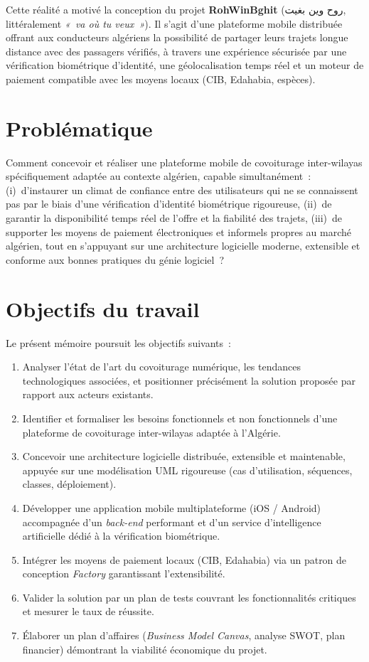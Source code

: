 \documentclass[12pt, a4paper, oneside]{report}
\begin{document}
Cette réalité a motivé la conception du projet \textbf{RohWinBghit} (\textarabic{روح وين بغيت}, littéralement \textit{«~va où tu veux~»}). Il s'agit d'une plateforme mobile distribuée offrant aux conducteurs algériens la possibilité de partager leurs trajets longue distance avec des passagers vérifiés, à travers une expérience sécurisée par une vérification biométrique d'identité, une géolocalisation temps réel et un moteur de paiement compatible avec les moyens locaux (CIB, Edahabia, espèces).

\section*{Problématique}

Comment concevoir et réaliser une plateforme mobile de covoiturage inter-wilayas spécifiquement adaptée au contexte algérien, capable simultanément~: (i)~d'instaurer un climat de confiance entre des utilisateurs qui ne se connaissent pas par le biais d'une vérification d'identité biométrique rigoureuse, (ii)~de garantir la disponibilité temps réel de l'offre et la fiabilité des trajets, (iii)~de supporter les moyens de paiement électroniques et informels propres au marché algérien, tout en s'appuyant sur une architecture logicielle moderne, extensible et conforme aux bonnes pratiques du génie logiciel~?

\section*{Objectifs du travail}

Le présent mémoire poursuit les objectifs suivants~:
\begin{enumerate}[leftmargin=1.8em]
  \item Analyser l'état de l'art du covoiturage numérique, les tendances technologiques associées, et positionner précisément la solution proposée par rapport aux acteurs existants.
  \item Identifier et formaliser les besoins fonctionnels et non fonctionnels d'une plateforme de covoiturage inter-wilayas adaptée à l'Algérie.
  \item Concevoir une architecture logicielle distribuée, extensible et maintenable, appuyée sur une modélisation UML rigoureuse (cas d'utilisation, séquences, classes, déploiement).
  \item Développer une application mobile multiplateforme (iOS / Android) accompagnée d'un \textit{back-end} performant et d'un service d'intelligence artificielle dédié à la vérification biométrique.
  \item Intégrer les moyens de paiement locaux (CIB, Edahabia) via un patron de conception \textit{Factory} garantissant l'extensibilité.
  \item Valider la solution par un plan de tests couvrant les fonctionnalités critiques et mesurer le taux de réussite.
  \item Élaborer un plan d'affaires (\textit{Business Model Canvas}, analyse SWOT, plan financier) démontrant la viabilité économique du projet.
\end{enumerate}
\end{document}
